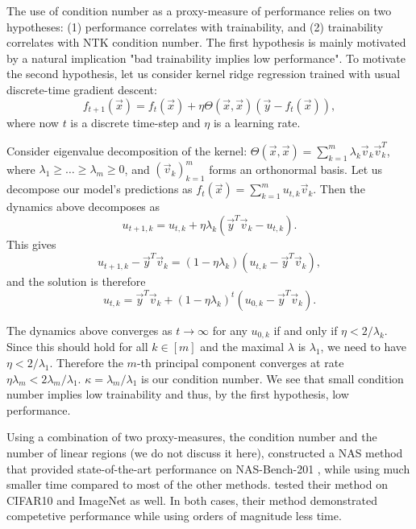 \documentclass{article}
\begin{document}
    The use of condition number as a proxy-measure of performance relies on two hypotheses: (1) performance correlates with trainability, and (2) trainability correlates with NTK condition number.
    The first hypothesis is mainly motivated by a natural implication "bad trainability implies low performance".
    To motivate the second hypothesis, let us consider kernel ridge regression trained with usual discrete-time gradient descent:
    \begin{equation}
        f_{t+1}(\vec x)
        = f_t(\vec x) + \eta \Theta(\vec x, \vec x) (\vec y - f_t(\vec x)),
    \end{equation}
    where now $t$ is a discrete time-step and $\eta$ is a learning rate.

    Consider eigenvalue decomposition of the kernel: $\Theta(\vec x, \vec x) = \sum_{k=1}^m \lambda_k \vec v_k \vec v_k^T$, where $\lambda_1 \geq \ldots \geq \lambda_m \geq 0$, and $(\vec v_k)_{k=1}^m$ forms an orthonormal basis.
    Let us decompose our model's predictions as $f_t(\vec x) = \sum_{k=1}^m u_{t,k} \vec v_k$.
    Then the dynamics above decomposes as
    \begin{equation}
        u_{t+1,k}
        = u_{t,k} + \eta \lambda_k (\vec y^T \vec v_k - u_{t,k}).
    \end{equation}
    This gives
    \begin{equation}
        u_{t+1,k} - \vec y^T \vec v_k
        = (1 - \eta \lambda_k) (u_{t,k} - \vec y^T \vec v_k),
    \end{equation}
    and the solution is therefore
    \begin{equation}
        u_{t,k}
        = \vec y^T \vec v_k + (1 - \eta \lambda_k)^t (u_{0,k} - \vec y^T \vec v_k).
    \end{equation}

    The dynamics above converges as $t \to \infty$ for any $u_{0,k}$ if and only if $\eta < 2 / \lambda_k$.
    Since this should hold for all $k \in [m]$ and the maximal $\lambda$ is $\lambda_1$, we need to have $\eta < 2 / \lambda_1$.
    Therefore the $m$-th principal component converges at rate $\eta \lambda_m < 2 \lambda_m / \lambda_1$.
    $\kappa = \lambda_m / \lambda_1$ is our condition number.
    We see that small condition number implies low trainability and thus, by the first hypothesis, low performance.

    Using a combination of two proxy-measures, the condition number and the number of linear regions (we do not discuss it here), \cite{chen2021neural} constructed a NAS method that provided state-of-the-art performance on NAS-Bench-201 \cite{dong2020bench}, while using much smaller time compared to most of the other methods.
    \cite{chen2021neural} tested their method on CIFAR10 and ImageNet as well.
    In both cases, their method demonstrated competetive performance while using orders of magnitude less time.
\end{document}
